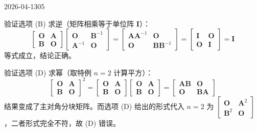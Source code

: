 \begin{mistake}{2026-04-13}{05}
\begin{solutioncontent}
验证选项 (B) 求逆（矩阵相乘等于单位阵 \(\boldsymbol{I}\)）：
\[
\begin{bmatrix} \boldsymbol{O} & \boldsymbol{A} \\ \boldsymbol{B} & \boldsymbol{O} \end{bmatrix} \begin{bmatrix} \boldsymbol{O} & \boldsymbol{B}^{-1} \\ \boldsymbol{A}^{-1} & \boldsymbol{O} \end{bmatrix} = \begin{bmatrix} \boldsymbol{A}\boldsymbol{A}^{-1} & \boldsymbol{O} \\ \boldsymbol{O} & \boldsymbol{B}\boldsymbol{B}^{-1} \end{bmatrix} = \begin{bmatrix} \boldsymbol{I} & \boldsymbol{O} \\ \boldsymbol{O} & \boldsymbol{I} \end{bmatrix} = \boldsymbol{I}
\]
等式成立，结论正确。

验证选项 (D) 求幂（取特例 \(n=2\) 计算平方）：
\[
\begin{bmatrix} \boldsymbol{O} & \boldsymbol{A} \\ \boldsymbol{B} & \boldsymbol{O} \end{bmatrix}^2 = \begin{bmatrix} \boldsymbol{O} & \boldsymbol{A} \\ \boldsymbol{B} & \boldsymbol{O} \end{bmatrix} \begin{bmatrix} \boldsymbol{O} & \boldsymbol{A} \\ \boldsymbol{B} & \boldsymbol{O} \end{bmatrix} = \begin{bmatrix} \boldsymbol{A}\boldsymbol{B} & \boldsymbol{O} \\ \boldsymbol{O} & \boldsymbol{B}\boldsymbol{A} \end{bmatrix}
\]
结果变成了主对角分块矩阵。而选项 (D) 给出的形式代入 \(n=2\) 为 \(\begin{bmatrix} \boldsymbol{O} & \boldsymbol{A}^2 \\ \boldsymbol{B}^2 & \boldsymbol{O} \end{bmatrix}\)，二者形式完全不符，故 (D) 错误。
\end{solutioncontent}


\end{mistake}
